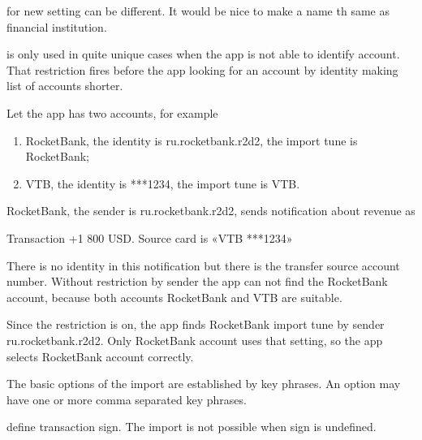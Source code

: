 \documentclass[a4paper,10pt,english]{sphinxmanual}
\begin{document}
\noindent{}

\noindent{}

\noindent{}

 for new setting can be different. It would be nice to make a name th same as
financial institution.

 is only used in quite unique cases when the app is not able
to identify account. That restriction fires before the app looking for an account by identity making list
of accounts shorter.

Let the app has two accounts, for example
\begin{enumerate}
\def\theenumi{\arabic{enumi}}
\def\labelenumi{\theenumi .}
\makeatletter\def\p@enumii{\p@enumi \theenumi .}\makeatother
\item {} 
RocketBank, the identity is ru.rocketbank.r2d2, the import tune is RocketBank;

\item {} 
VTB, the identity is ***1234, the import tune is VTB.

\end{enumerate}

RocketBank, the sender is ru.rocketbank.r2d2, sends notification about revenue as

\begin{sphinxVerbatim}[commandchars=\\\{\}]
Transaction \PYGZgt{}\PYGZgt{} +1 800 USD.
Source card is «VTB ***1234»
\end{sphinxVerbatim}

There is no identity in this notification but there is the transfer source account number. Without
restriction by sender the app can not find the RocketBank account, because both accounts
RocketBank and VTB are suitable.

Since the restriction is on, the app finds RocketBank import tune by sender ru.rocketbank.r2d2.
Only RocketBank account uses that setting, so the app selects RocketBank account correctly.

The basic options of the import are established by key phrases. An option may have one or more
comma separated key phrases.

 define transaction sign. The import is not possible when
sign is undefined.
\end{document}
